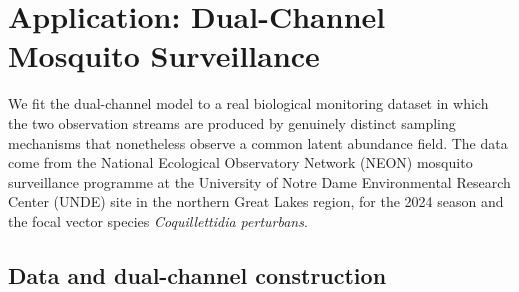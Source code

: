 \documentclass[preprint,12pt]{elsarticle}
\theoremstyle{definition}
\begin{document}

\section{Application: Dual-Channel Mosquito Surveillance}
\label{sec:neon-mosq}

We fit the dual-channel model to a real biological monitoring dataset in which
the two observation streams are produced by genuinely distinct sampling
mechanisms that nonetheless observe a common latent abundance field. The data
come from the National Ecological Observatory Network (NEON) mosquito
surveillance programme \citep{neon2024} at the University of Notre Dame Environmental Research Center (UNDE) site in the northern Great Lakes region, for the
2024 season and the focal vector species \emph{Coquillettidia perturbans}.

\subsection{Data and dual-channel construction}
\label{sec:neon-data}
\end{document}

